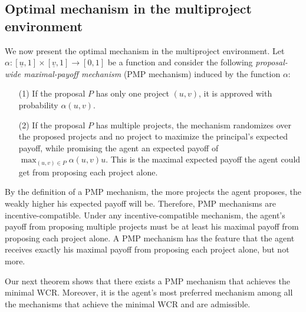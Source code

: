 \documentclass[12pt,english]{article}
\newcommand{\underv}{\underline{v}}
\newcommand{\underu}{{\underline{u}}}
\theoremstyle{remark}
\theoremstyle{plain}
\theoremstyle{definition}
\newcommand{\wcr}{\mathrm{WCR}}
\begin{document}
\subsection{Optimal mechanism in the multiproject environment}\label{se:multi}

We now present the optimal mechanism in the multiproject environment. Let $\alpha:[\underu, 1]\times [\underv, 1]\to [0,1]$ be a function and consider the following \emph{proposal-wide maximal-payoff mechanism} (PMP mechanism) induced by the function $\alpha$: 
\begin{enumerate}
\vspace{-0.35cm} \item[(1)] If the proposal $P$ has only one project $(u,v)$, it is approved with probability $\alpha(u,v)$.
\vspace{-0.35cm} \item[(2)] If the proposal $P$ has multiple projects, the mechanism randomizes over the proposed projects and no project to maximize the principal's expected payoff, while promising the agent an expected payoff of $\max_{(u,v)\in P}\alpha(u,v)u$. This is the maximal expected payoff the agent could get from proposing each project alone.
\end{enumerate}
By the definition of a PMP mechanism, the more projects the agent proposes, the weakly higher his expected payoff will be. Therefore, PMP mechanisms are incentive-compatible. Under any incentive-compatible mechanism, the agent's payoff from proposing multiple projects must be at least his maximal payoff from proposing each project alone. A PMP mechanism has the feature that the agent receives exactly his maximal payoff from proposing each project alone, but not more. 


Our next theorem shows that there exists a PMP mechanism that achieves the minimal $\wcr$. Moreover, it is the agent's most preferred mechanism among all the mechanisms that achieve the minimal $\wcr$ and are admissible.
\end{document}
